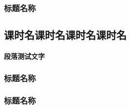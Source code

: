 \documentclass[color=BLUE]{textbook-cn}%
\begin{document}
\begin{Paracol}
\subsubsection{标题名称}
\lipsum[1]

\Example{\lipsum[1][1-5]}
\Answer{\lipsum[1][1-5]}




\begin{Method}
\lipsum[1][1-8]
\end{Method}



\Example{\zhlipsum[1]}
\Answer{\lipsum[1][1-5]}
\Answer*{\lipsum[1][1-5]}

\Variety{\lipsum[1][1-5]}
\Answer{\lipsum[1][1-5]}





\begin{Mind}[控制变量]
\lipsum[2]
\end{Mind}




\begin{Display}[向心力]
\lipsum[2]
\lipsum[2]\lipsum[2][1-2]
\end{Display}


\begin{Application}
\lipsum[2]
\lipsum[2]
\end{Application}

\subsection{课时名课时名课时名课时名}
\paragraph{段落测试文字}
\lipsum[3]

\subsubsection{标题名称}
\lipsum[1]

\begin{History}
\lipsum[1-2]
\end{History}


\begin{STS}
\lipsum[1-2]
\end{STS}



\begin{Information}
\lipsum[2]
\end{Information}


\subsubsection{标题名称}


\lipsum[1]

\end{Paracol}
\end{document}
